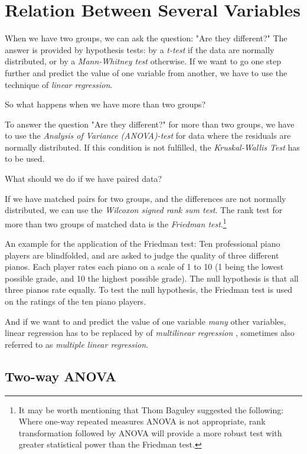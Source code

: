 \chapter{Relation Between Several Variables}

When we have two groups, we can ask the question: "Are they different?" The answer is provided by hypothesis tests: by a \emph{t-test} if the data are normally distributed, or by a \emph{Mann-Whitney test} otherwise. If we want to go one step further and predict the value of one variable from another, we have to use the technique of \emph{linear regression}.

So what happens when we have more than two groups?

To answer the question "Are they different?" for more than two groups, we have to use the \emph{Analysis of Variance (ANOVA)-test} for data where the residuals are normally distributed. If this condition is not fulfilled, the \emph{Kruskal-Wallis Test} has to be used.

What should we do if we have paired data?

If we have matched pairs for two groups, and the differences are not normally distributed, we can use the \emph{Wilcoxon signed rank sum test}. The rank test for more than two groups of matched data is the \emph{Friedman test}.\footnote{It may be worth mentioning that Thom Baguley suggested the following: Where one-way repeated measures ANOVA is not appropriate, rank transformation followed by ANOVA will provide a more robust test with greater statistical power than the Friedman test.}

An example for the application of the Friedman test: Ten professional piano players are blindfolded, and are asked to judge the quality of three different pianos. Each player rates each piano on a scale of 1 to 10 (1 being the lowest possible grade, and 10 the highest possible grade). The null hypothesis is that all three pianos rate equally. To test the null hypothesis, the Friedman test is used on the ratings of the ten piano players.

And if we want to and predict the value of one variable \emph{many} other variables, linear regression has to be replaced by of \emph{multilinear regression} , sometimes also referred to as \emph{multiple linear regression}.

\section{Two-way ANOVA} \label{sec:anovaTwoWay}  


